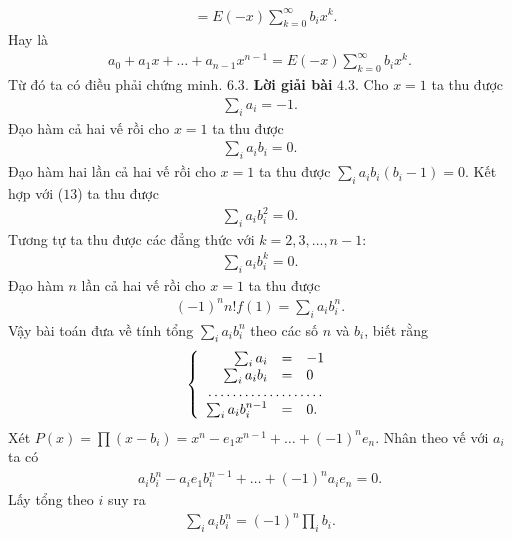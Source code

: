 \begin{multicols}{2}
\begin{align*}
		&=E(-x) \sum_{k=0}^\infty b_i x^k.
	\end{align*}
	Hay là
	\begin{align*}
		a_0+a_1 x+\ldots + a_{n-1}x^{n-1}= 
		E(-x) \sum_{k=0}^\infty b_i x^k.
	\end{align*}
	Từ đó ta có điều phải chứng minh. 
	\vskip 0.1cm	
	$\pmb{6.3.}$ \textbf{\color{hoccungpi}Lời giải bài} $\pmb{4.3.}$
	Cho $x=1$ ta thu được 
	\begin{align*}
			\sum_i a_i=-1. \tag{$12$}
	\end{align*}
	Đạo hàm cả hai vế rồi cho $x=1$ ta thu được
	\begin{align*}
		\sum_i a_ib_i=0. \tag{$13$}
	\end{align*}
	Đạo hàm hai lần cả hai vế rồi cho $x=1$ ta thu được
	$ \sum_i a_ib_i(b_i-1)=0$.
	Kết hợp với ($13$) ta thu được
	\begin{align*}
		\sum_i a_ib_i^2 =0. \tag{$14$} 
	\end{align*}
	Tương tự ta thu được các đẳng thức với $k=2,3,\ldots, n-1$:
	\begin{align*}
		\sum_i a_ib_i^k =0. \tag{$15$}
	\end{align*}
	Đạo hàm $n$ lần cả hai vế rồi cho $x=1$ ta thu được
	\begin{align*}
		(-1)^n n! f(1)=\sum_ia_i b_i^n  .
	\end{align*}
	Vậy bài toán đưa về  tính tổng $\sum_i a_ib_i^n $ theo các số $n$ và $b_i$, biết rằng 
	\begin{align*}
		\left\{\begin{array}{rcl}
			\sum_i a_i&=&-1 \\
			\sum_i a_ib_i&=&0\\
			\multicolumn{3}{c}{\dotfill }\\
			\sum_i a_i b_i^{n-1}&=&0.\end{array}\right.
	\end{align*}
	Xét $P(x)=\prod(x-b_i)=x^n-e_1x^{n-1}+\ldots+(-1)^ne_n$. 
	Nhân theo vế với $a_i$  ta có
	\begin{align*}
		a_ib_i^n-a_ie_1b_i^{n-1}+\ldots+(-1)^na_ie_n=0.
	\end{align*}
	Lấy tổng theo $i$ suy ra
	\begin{align*}
		\sum_i a_ib_i^n=(-1)^n\prod_i b_i.
	\end{align*}
\end{multicols}